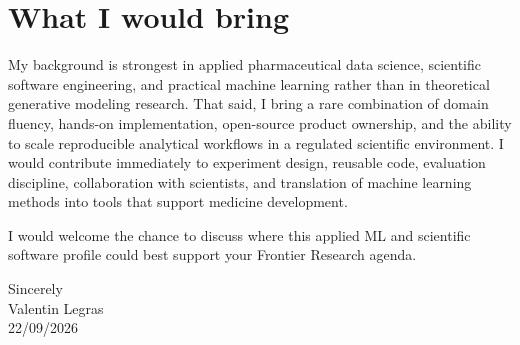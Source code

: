 \documentclass[11pt,a4paper]{article}
\newcommand{\SignDate}{22/09/2026}
\begin{document}
\section{What I would bring}
My background is strongest in applied pharmaceutical data science, scientific
software engineering, and practical machine learning rather than in theoretical
generative modeling research. That said, I bring a rare combination of domain
fluency, hands-on implementation, open-source product ownership, and the ability
to scale reproducible analytical workflows in a regulated scientific
environment. I would contribute immediately to experiment design, reusable code,
evaluation discipline, collaboration with scientists, and translation of machine
learning methods into tools that support medicine development.

I would welcome the chance to discuss where this applied ML and scientific
software profile could best support your Frontier Research agenda.

\vspace{6pt}
Sincerely\\[6pt]
Valentin Legras\\
\SignDate{}
\end{document}
